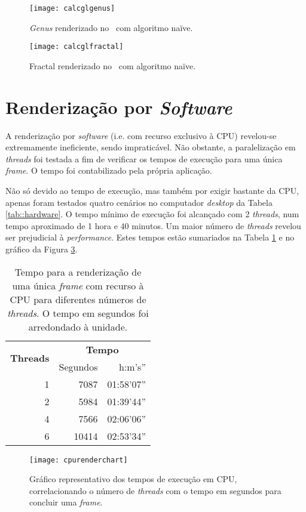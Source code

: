 \begin{figure}[!hbp]
	\centering
	\texttt{[image: calcglgenus]}
	\caption[\textit{Genus} no \theapp~com algoritmo naïve]{\textit{Genus} renderizado no \theapp~com algoritmo naïve.}
	\label{fig::calcglgenus}
\end{figure}

\begin{figure}[!hbp]
	\centering
	\texttt{[image: calcglfractal]}
	\caption[Fractal no \theapp~com algoritmo naïve]{Fractal renderizado no \theapp~com algoritmo naïve.}
	\label{fig::calcglfractal}
\end{figure}


\section{Renderização por \textit{Software}}
\label{sec::testes:software}

A renderização por \textit{software} (i.e. com recurso exclusivo à \ac{CPU}) revelou-se extremamente ineficiente, sendo impraticável. Não obstante, a paralelização em \textit{threads} foi testada a fim de verificar os tempos de execução para uma única \textit{frame}. O tempo foi contabilizado pela própria aplicação.

Não só devido ao tempo de execução, mas também por exigir bastante da \ac{CPU}, apenas foram testados quatro cenários no computador \textit{desktop} da Tabela \ref{tab::hardware}. O tempo mínimo de execução foi alcançado com 2 \textit{threads}, num tempo aproximado de 1 hora e 40 minutos. Um maior número de \textit{threads} revelou ser prejudicial à \textit{performance}. Estes tempos estão sumariados na Tabela \ref{tab::render_cpu} e no gráfico da Figura \ref{fig::cpurenderchart}.

\begin{table}[!bp]
	\centering
	\caption[Tempos de renderização em \acs{CPU}]{Tempo para a renderização de uma única \textit{frame} com recurso à \acs{CPU} para diferentes números de \textit{threads}. O tempo em segundos foi arredondado à unidade.}
	\label{tab::render_cpu}
	\begin{tabular}{r r r}
		\toprule
		\multirow{2}{*}{\textbf{Threads}} & \multicolumn{2}{c}{\textbf{Tempo}} \\
		\cline{2-3}
		& Segundos & h:m's'' \\
		\midrule
		1 &  7087 & 01:58'07'' \\
		2 &  5984 & 01:39'44'' \\
		4 &  7566 & 02:06'06'' \\
		6 & 10414 & 02:53'34'' \\
		\bottomrule
	\end{tabular}
\end{table}

\begin{figure}[!hbtp]
	\centering
	\texttt{[image: cpurenderchart]}
	\caption[Gráfico dos tempos de execução em \acs{CPU}]{Gráfico representativo dos tempos de execução em \acs{CPU}, correlacionando o número de \textit{threads} com o tempo em segundos para concluir uma \textit{frame}.}
	\label{fig::cpurenderchart}
\end{figure}
